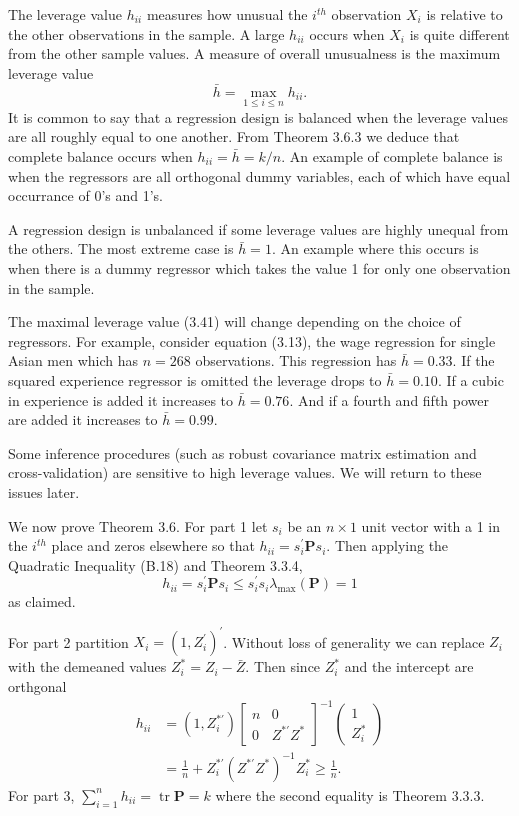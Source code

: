 \documentclass[10pt]{article}
\begin{document}
The leverage value $h_{i i}$ measures how unusual the $i^{t h}$ observation $X_{i}$ is relative to the other observations in the sample. A large $h_{i i}$ occurs when $X_{i}$ is quite different from the other sample values. A measure of overall unusualness is the maximum leverage value
$$
\bar{h}=\max _{1 \leq i \leq n} h_{i i} .
$$
It is common to say that a regression design is balanced when the leverage values are all roughly equal to one another. From Theorem 3.6.3 we deduce that complete balance occurs when $h_{i i}=\bar{h}=k / n$. An example of complete balance is when the regressors are all orthogonal dummy variables, each of which have equal occurrance of 0's and 1's.

A regression design is unbalanced if some leverage values are highly unequal from the others. The most extreme case is $\bar{h}=1$. An example where this occurs is when there is a dummy regressor which takes the value 1 for only one observation in the sample.

The maximal leverage value (3.41) will change depending on the choice of regressors. For example, consider equation (3.13), the wage regression for single Asian men which has $n=268$ observations. This regression has $\bar{h}=0.33$. If the squared experience regressor is omitted the leverage drops to $\bar{h}=0.10$. If a cubic in experience is added it increases to $\bar{h}=0.76$. And if a fourth and fifth power are added it increases to $\bar{h}=0.99$.

Some inference procedures (such as robust covariance matrix estimation and cross-validation) are sensitive to high leverage values. We will return to these issues later.

We now prove Theorem 3.6. For part 1 let $s_{i}$ be an $n \times 1$ unit vector with a 1 in the $i^{t h}$ place and zeros elsewhere so that $h_{i i}=s_{i}^{\prime} \boldsymbol{P} s_{i}$. Then applying the Quadratic Inequality (B.18) and Theorem 3.3.4,
$$
h_{i i}=s_{i}^{\prime} \boldsymbol{P} s_{i} \leq s_{i}^{\prime} s_{i} \lambda_{\max }(\boldsymbol{P})=1
$$
as claimed.

For part 2 partition $X_{i}=\left(1, Z_{i}^{\prime}\right)^{\prime}$. Without loss of generality we can replace $Z_{i}$ with the demeaned values $Z_{i}^{*}=Z_{i}-\bar{Z}$. Then since $Z_{i}^{*}$ and the intercept are orthgonal
$$
\begin{aligned}
h_{i i} &=\left(1, Z_{i}^{* \prime}\right)\left[\begin{array}{cc}
n & 0 \\
0 & Z^{* \prime} Z^{*}
\end{array}\right]^{-1}\left(\begin{array}{c}
1 \\
Z_{i}^{*}
\end{array}\right) \\
&=\frac{1}{n}+Z_{i}^{* \prime}\left(Z^{* \prime} Z^{*}\right)^{-1} Z_{i}^{*} \geq \frac{1}{n} .
\end{aligned}
$$
For part 3, $\sum_{i=1}^{n} h_{i i}=\operatorname{tr} \boldsymbol{P}=k$ where the second equality is Theorem 3.3.3.
\end{document}
